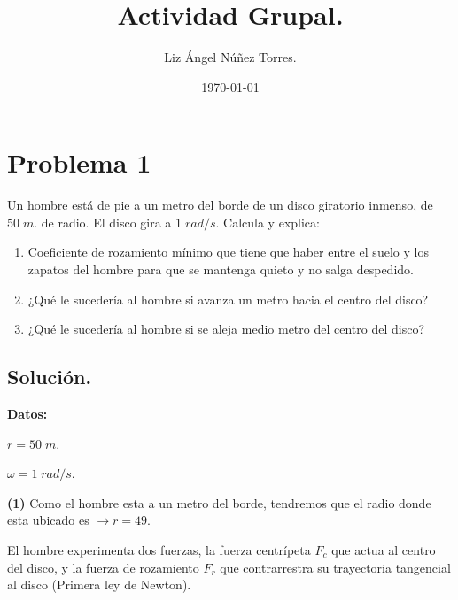 \documentclass[a4paper,12pt]{article} %
\title{Actividad Grupal.}
\author{Liz Ángel Núñez Torres.}
\date{\today}
\begin{document}
\maketitle 

\section*{Problema 1} %

\begin{justify}
    Un hombre está de pie a un metro del borde de un disco giratorio inmenso, de \(50 \; m.\) de radio. El disco gira a \(1 \; rad/s.\) Calcula y explica:
\end{justify}

\begin{enumerate}
    \item Coeficiente de rozamiento mínimo que tiene que haber entre el suelo y los zapatos del hombre para que se mantenga quieto y no salga despedido.
    \item ¿Qué le sucedería al hombre si avanza un metro hacia el centro del disco?
    \item ¿Qué le sucedería al hombre si se aleja medio metro del centro del disco?
\end{enumerate}

\vspace{\baselineskip}

\subsection*{Solución.}

\begin{justify}
    \textbf{Datos:}
\end{justify}

\begin{multicols}{2}
    \(r = 50 \; m.\)
    
\columnbreak
    \(\omega = 1 \; rad/s.\)
    
\end{multicols}

\begin{justify}
    \textbf{(1)} Como el hombre esta a un metro del borde, tendremos que el radio donde esta ubicado es \(\rightarrow r = 49.\)
\end{justify}

\begin{justify}
    El hombre experimenta dos fuerzas, la fuerza centrípeta \(F_c\) que actua al centro del disco, y la fuerza de rozamiento \(F_r\) que contrarrestra su trayectoria tangencial al disco (Primera ley de Newton).
\end{justify}
\end{document}
